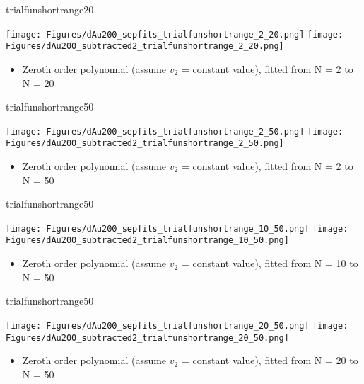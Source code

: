 \documentclass[aspectratio=169,compress,10pt]{beamer}
\begin{document}
\begin{frame}{trialfunshortrange20}
\begin{center}
\texttt{[image: Figures/dAu200\_sepfits\_trialfunshortrange\_2\_20.png]}
\texttt{[image: Figures/dAu200\_subtracted2\_trialfunshortrange\_2\_20.png]}
\end{center}
\begin{itemize}
\item Zeroth order polynomial (assume $v_2$ = constant value), fitted from N = 2 to N = 20
\end{itemize}
\end{frame}



\begin{frame}{trialfunshortrange50}
\begin{center}
\texttt{[image: Figures/dAu200\_sepfits\_trialfunshortrange\_2\_50.png]}
\texttt{[image: Figures/dAu200\_subtracted2\_trialfunshortrange\_2\_50.png]}
\end{center}
\begin{itemize}
\item Zeroth order polynomial (assume $v_2$ = constant value), fitted from N = 2 to N = 50
\end{itemize}
\end{frame}



\begin{frame}{trialfunshortrange50}
\begin{center}
\texttt{[image: Figures/dAu200\_sepfits\_trialfunshortrange\_10\_50.png]}
\texttt{[image: Figures/dAu200\_subtracted2\_trialfunshortrange\_10\_50.png]}
\end{center}
\begin{itemize}
\item Zeroth order polynomial (assume $v_2$ = constant value), fitted from N = 10 to N = 50
\end{itemize}
\end{frame}


\begin{frame}{trialfunshortrange50}
\begin{center}
\texttt{[image: Figures/dAu200\_sepfits\_trialfunshortrange\_20\_50.png]}
\texttt{[image: Figures/dAu200\_subtracted2\_trialfunshortrange\_20\_50.png]}
\end{center}
\begin{itemize}
\item Zeroth order polynomial (assume $v_2$ = constant value), fitted from N = 20 to N = 50
\end{itemize}
\end{frame}
\end{document}

